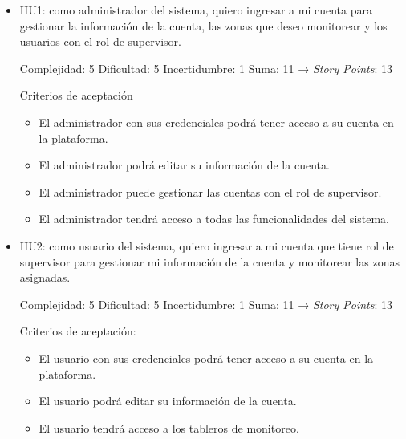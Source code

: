 \documentclass[
11pt, %
]{charter}
\begin{document}
\begin{itemize}

	\item HU1: como administrador del sistema, quiero ingresar a mi cuenta para gestionar la información de la cuenta, las zonas que deseo monitorear y los usuarios con el rol de supervisor.

	Complejidad: 5
	Dificultad: 5
	Incertidumbre: 1
	Suma: 11 → \textit{Story Points}: 13

	Criterios de aceptación
	\begin{itemize}
		\item El administrador con sus credenciales podrá tener acceso a su cuenta en la plataforma.
		\item El administrador podrá editar su información de la cuenta.
		\item El administrador puede gestionar las cuentas con el rol de supervisor.
		\item El administrador tendrá acceso a todas las funcionalidades del sistema.
	\end{itemize}

	\item HU2: como usuario del sistema, quiero ingresar a mi cuenta que tiene rol de supervisor para gestionar mi información de la cuenta y monitorear las zonas asignadas.

	Complejidad: 5
	Dificultad: 5
	Incertidumbre: 1
	Suma: 11 → \textit{Story Points}: 13

	Criterios de aceptación:
	\begin{itemize}
		\item El usuario con sus credenciales podrá tener acceso a su cuenta en la plataforma.
		\item El usuario podrá editar su información de la cuenta.
		\item El usuario tendrá acceso a los tableros de monitoreo.
	\end{itemize}

\end{itemize}
\end{document}
